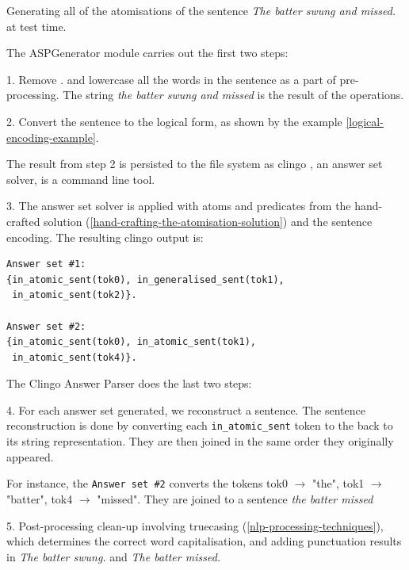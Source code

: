\begin{example}
Generating all of the atomisations of the sentence \emph{The batter swung and missed.} at test time.

The ASPGenerator module carries out the first two steps:

1. Remove . and lowercase all the words in the sentence as a part of pre-processing. The string \emph{the batter swung and missed} is the result of the operations.

2. Convert the sentence to the logical form, as shown by the example \ref{logical-encoding-example}.

The result from step 2 is persisted to the file system as clingo \cite{RefWorks:RefID:22-clingo}, an answer set solver, is a command line tool.

3. The answer set solver is applied with atoms and predicates from the hand-crafted solution (\ref{hand-crafting-the-atomisation-solution}) and the sentence encoding. The resulting clingo output is:
\begin{verbatim}
Answer set #1: 
{in_atomic_sent(tok0), in_generalised_sent(tok1), 
 in_atomic_sent(tok2)}.
    
Answer set #2:
{in_atomic_sent(tok0), in_atomic_sent(tok1), 
 in_atomic_sent(tok4)}.
\end{verbatim}

The Clingo Answer Parser does the last two steps:

4. For each answer set generated, we reconstruct a sentence. 
The sentence reconstruction is done by converting each \verb+in_atomic_sent+ token to the back to its string representation.
They are then joined in the same order they originally appeared.

For instance, the \verb_Answer set #2_ converts the tokens tok0 $\rightarrow$ "the", tok1 $\rightarrow$ "batter", tok4 $\rightarrow$ "missed".
They are joined to a sentence \textit{the batter missed}

5. Post-processing clean-up involving truecasing (\ref{nlp-processing-techniques}), which determines the correct word capitalisation, and adding punctuation results in \emph{The batter swung.} and \emph{The batter missed.} \\
\end{example}
 

